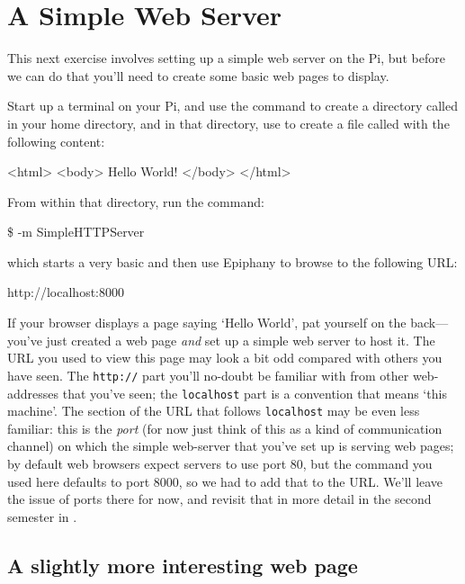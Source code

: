 \section{A Simple Web Server}

This next exercise involves setting up a simple web server on the Pi, but before we can do that you'll need to create some basic web pages to display.

Start up a terminal on your Pi, and use the  command to create a directory called  in your home directory, and in that directory, use  to create a file called  with the following content:

\begin{ttoutenv}
<html>
  <body>
    Hello World!
  </body>
</html>
\end{ttoutenv}

From within that directory, run the command:

\begin{ttoutenv}
\$  -m SimpleHTTPServer
\end{ttoutenv}

which starts a very basic  and then use Epiphany to browse to the following URL:

\begin{ttoutenv}
http://localhost:8000
\end{ttoutenv}

If your browser displays a page saying `Hello World', pat yourself on the back---you've just created a web page \textit{and} set up a simple web server to host it. The URL you used to view this page may look a bit odd compared with others you have seen. The \texttt{http://} part you'll no-doubt be familiar with from other web-addresses that you've seen; the \texttt{localhost} part is a convention that means `this machine'. The section of the URL that follows \texttt{localhost} may be even less familiar: this is the \textit{port} (for now just think of this as a kind of communication channel) on which the simple web-server that you've set up is serving web pages; by default web browsers expect servers to use port 80, but the  command you used here defaults to port 8000, so we had to add that to the URL. We'll leave the issue of ports there for now, and revisit that in more detail in the second semester in .

\subsection{A slightly more interesting web page}

